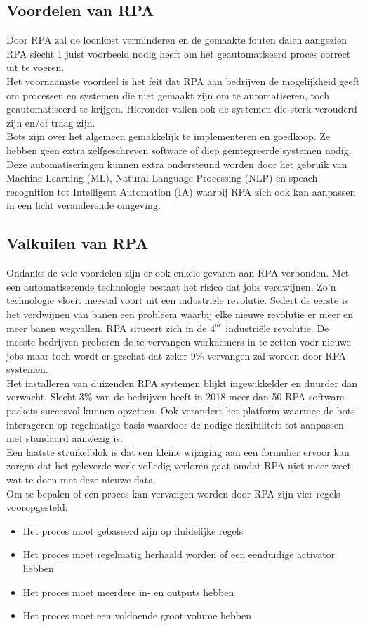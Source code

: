 \subsection{Voordelen van RPA}
Door RPA zal de loonkost verminderen en de gemaakte fouten dalen aangezien RPA slecht 1 juist voorbeeld nodig heeft om het geautomatiseerd proces correct uit te voeren.\\
Het voornaamste voordeel is het feit dat RPA aan bedrijven de mogelijkheid geeft om processen en systemen die niet gemaakt zijn om te automatiseren, toch geautomatiseerd te krijgen. Hieronder vallen ook de systemen die sterk verouderd zijn en/of  traag zijn. \\
Bots zijn over het algemeen gemakkelijk te implementeren en goedkoop. Ze hebben geen extra zelfgeschreven software of diep geïntegreerde systemen nodig.\\
Deze automatiseringen kunnen extra ondersteund worden door het gebruik van Machine Learning  (ML),  Natural Language Processing (NLP) en speach recognition tot  Intelligent Automation (IA) waarbij RPA zich ook kan aanpassen in een licht veranderende omgeving. \autocite{whatIsRPA}

\subsection{Valkuilen van RPA}
Ondanks de vele voordelen zijn er ook enkele gevaren aan RPA verbonden. Met een automatiserende technologie bestaat het risico dat jobs verdwijnen. Zo'n technologie vloeit meestal voort uit een industriële revolutie. Sedert de eerste is het verdwijnen van banen een probleem waarbij elke nieuwe revolutie er meer en meer banen wegvallen. RPA situeert zich in de $4^{de}$ industriële revolutie. De meeste bedrijven proberen de te vervangen werknemers in te zetten voor nieuwe jobs maar toch wordt er geschat dat zeker 9\% vervangen zal worden door RPA systemen.\\
Het installeren van duizenden RPA systemen blijkt ingewikkelder en duurder dan verwacht. Slecht 3\% van de bedrijven heeft in 2018 meer dan 50 RPA software packets succesvol kunnen opzetten. Ook verandert het platform waarmee de bots interageren op regelmatige basis waardoor de nodige flexibiliteit tot aanpassen niet standaard aanwezig is.\\
Een laatste struikelblok is dat een kleine wijziging aan een formulier ervoor  kan zorgen dat het geleverde werk volledig verloren gaat omdat RPA niet meer weet wat te doen met deze nieuwe data. \autocite{whatIsRPA}\\
\newline
Om te bepalen of een proces kan vervangen worden door RPA zijn vier regels vooropgesteld:
\begin{itemize}
	\item Het proces moet gebaseerd zijn op duidelijke regels
	\item Het proces moet regelmatig herhaald worden of een eenduidige activator hebben
	\item Het proces moet meerdere in- en outputs hebben
	\item Het proces moet een voldoende groot volume hebben
\end{itemize} \autocite{explainRPA}


